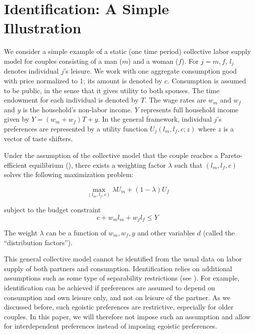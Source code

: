 \documentclass[11pt,letter]{article}
\begin{document}
\section{Identification: A Simple Illustration}

We consider a simple example of a static (one time period) collective labor supply model for couples consisting of a man ($m$) and a woman ($f$). For $j=m,f$, $l_j$ denotes individual $j$'s leisure. We work with one aggregate consumption good with price normalized to 1; its amount is denoted by  $c$. Consumption is assumed to be public, in the sense that it gives utility to both spouses. The time endowment for each individual is denoted by $T$. The wage rates are $w_{m}$ and $w_{f}$ and $y$ is the household's non-labor income. $Y$ represents full household income given by $Y=(w_{m}+w_{f})T+y$. In the general framework, individual $j$'s preferences are represented by a utility function $U_{j}(l_{m}, l_{f}, c; z)$ where $z$ is a vector of taste shifters.

\par Under the assumption of the collective model that the couple reaches a Pareto-efficient equilibrium (\citet{chiappori1988}), there exists a weighting factor $\lambda$ such that $(l_{m}, l_f, c)$ solves the following maximization problem:

\begin{equation}
\max\limits _{(l_{m},l_{f},c)} \lambda U_m+(1-\lambda) U_f
\end{equation}
\par subject to the budget constraint
\begin{equation}
c+w_ml_m+w_fl_f \le Y
\end{equation}

The weight $\lambda$ can be a function of $w_{m}, w_{f}, y$ and other variables $d$ (called the ``distribution factors'').

\par This general collective model cannot be identified from the usual data on labor supply of both partners and consumption. Identification relies on additional assumptions such as some type of separability restrictions (see \cite{chiappori1988, chiappori1992}).
For example, identification can be achieved if preferences are assumed to depend on consumption and own leisure only, and not on leisure of the partner. As we discussed before, such egoistic preferences are restrictive, especially for older couples. In this paper, we will therefore not impose such an assumption and allow for interdependent preferences instead of imposing egoistic preferences.
\end{document}
